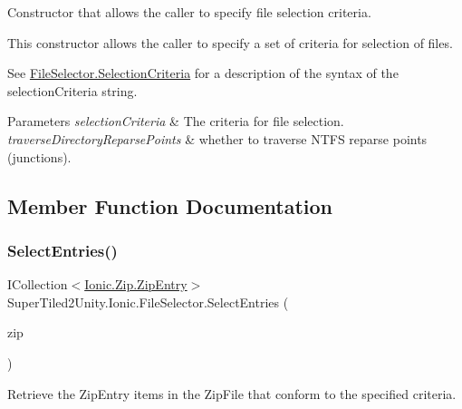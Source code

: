 Constructor that allows the caller to specify file selection criteria. 

This constructor allows the caller to specify a set of criteria for selection of files. 

See \mbox{\hyperlink{class_super_tiled2_unity_1_1_ionic_1_1_file_selector_a0f2d26f8fb39862f504bc0069365ff39}{File\+Selector.\+Selection\+Criteria}} for a description of the syntax of the selection\+Criteria string. 


\begin{DoxyParams}{Parameters}
{\em selection\+Criteria} & The criteria for file selection.\\
\hline
{\em traverse\+Directory\+Reparse\+Points} & whether to traverse N\+T\+FS reparse points (junctions). \\
\hline
\end{DoxyParams}


\subsection{Member Function Documentation}
\mbox{\label{class_super_tiled2_unity_1_1_ionic_1_1_file_selector_abe158bc9314c9c3cdb511da60fcd4766}} 
\subsubsection{\texorpdfstring{Select\+Entries()}{SelectEntries()}\hspace{0.1cm}{\footnotesize\ttfamily [1/2]}}
{\footnotesize\ttfamily I\+Collection$<$\mbox{\hyperlink{class_super_tiled2_unity_1_1_ionic_1_1_zip_1_1_zip_entry}{Ionic.\+Zip.\+Zip\+Entry}}$>$ Super\+Tiled2\+Unity.\+Ionic.\+File\+Selector.\+Select\+Entries (\begin{DoxyParamCaption}\item[{\mbox{\hyperlink{class_super_tiled2_unity_1_1_ionic_1_1_zip_1_1_zip_file}{Ionic.\+Zip.\+Zip\+File}}}]{zip }\end{DoxyParamCaption})}



Retrieve the Zip\+Entry items in the Zip\+File that conform to the specified criteria. 

